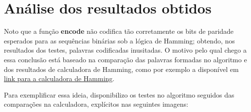 \documentclass{article}
\begin{document}
\section{Análise dos resultados obtidos}
Noto que a função \textbf{encode} não codifica tão corretamente os bits de paridade esperados para as sequências binárias sob a lógica de Hamming; obtendo, nos resultados dos testes, palavras codificadas inusitadas. O motivo pelo qual chego a essa conclusão está baseado na comparação das palavras formadas no algoritmo e dos resultados de calculadora de Hamming, como por exemplo a disponível em \href{http://www.mathaddict.net/hamming.htm}{link para a calculadora de Hamming}. 

Para exemplificar essa ideia, disponibilizo os testes no algoritmo seguidos das comparações na calculadora, explícitos nas seguintes imagens:
\end{document}
